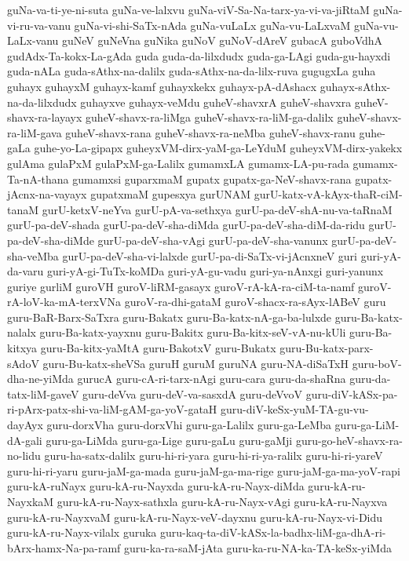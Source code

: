 {guNa-va-ti-ye-ni-suta
guNa-ve-lalxvu
guNa-viV-Sa-Na-tarx-ya-vi-va-jiRtaM
guNa-vi-ru-va-vanu
guNa-vi-shi-SaTx-nAda
guNa-vuLaLx
guNa-vu-LaLxvaM
guNa-vu-LaLx-vanu
guNeV
guNeVna
guNika
guNoV
guNoV-dAreV
gubacA
guboVdhA
gudAdx-Ta-kokx-La-gAda
guda
guda-da-lilxdudx
guda-ga-LAgi
guda-gu-hayxdi
guda-nALa
guda-sAthx-na-dalilx
guda-sAthx-na-da-lilx-ruva
gugugxLa
guha
guhayx
guhayxM
guhayx-kamf
guhayxkekx
guhayx-pA-dAshacx
guhayx-sAthx-na-da-lilxdudx
guhayxve
guhayx-veMdu
guheV-shavxrA
guheV-shavxra
guheV-shavx-ra-layayx
guheV-shavx-ra-liMga
guheV-shavx-ra-liM-ga-dalilx
guheV-shavx-ra-liM-gava
guheV-shavx-rana
guheV-shavx-ra-neMba
guheV-shavx-ranu
guhe-gaLa
guhe-yo-La-gipapx
guheyxVM-dirx-yaM-ga-LeYduM
guheyxVM-dirx-yakekx
gulAma
gulaPxM
gulaPxM-ga-Lalilx
gumamxLA
gumamx-LA-pu-rada
gumamx-Ta-nA-thana
gumamxsi
guparxmaM
gupatx
gupatx-ga-NeV-shavx-rana
gupatx-jAcnx-na-vayayx
gupatxmaM
gupesxya
gurUNAM
gurU-katx-vA-kAyx-thaR-ciM-tanaM
gurU-ketxV-neYva
gurU-pA-va-sethxya
gurU-pa-deV-shA-nu-va-taRnaM
gurU-pa-deV-shada
gurU-pa-deV-sha-diMda
gurU-pa-deV-sha-diM-da-ridu
gurU-pa-deV-sha-diMde
gurU-pa-deV-sha-vAgi
gurU-pa-deV-sha-vanunx
gurU-pa-deV-sha-veMba
gurU-pa-deV-sha-vi-lalxde
gurU-pa-di-SaTx-vi-jAcnxneV
guri
guri-yA-da-varu
guri-yA-gi-TuTx-koMDa
guri-yA-gu-vadu
guri-ya-nAnxgi
guri-yanunx
guriye
gurliM
guroVH
guroV-liRM-gasayx
guroV-rA-kA-ra-ciM-ta-namf
guroV-rA-loV-ka-mA-terxVNa
guroV-ra-dhi-gataM
guroV-shacx-ra-sAyx-lABeV
guru
guru-BaR-Barx-SaTxra
guru-Bakatx
guru-Ba-katx-nA-ga-ba-lulxde
guru-Ba-katx-nalalx
guru-Ba-katx-yayxnu
guru-Bakitx
guru-Ba-kitx-seV-vA-nu-kUli
guru-Ba-kitxya
guru-Ba-kitx-yaMtA
guru-BakotxV
guru-Bukatx
guru-Bu-katx-parx-sAdoV
guru-Bu-katx-sheVSa
guruH
guruM
guruNA
guru-NA-diSaTxH
guru-boV-dha-ne-yiMda
gurucA
guru-cA-ri-tarx-nAgi
guru-cara
guru-da-shaRna
guru-da-tatx-liM-gaveV
guru-deVva
guru-deV-va-sasxdA
guru-deVvoV
guru-diV-kASx-pa-ri-pArx-patx-shi-va-liM-gAM-ga-yoV-gataH
guru-diV-keSx-yuM-TA-gu-vu-dayAyx
guru-dorxVha
guru-dorxVhi
guru-ga-Lalilx
guru-ga-LeMba
guru-ga-LiM-dA-gali
guru-ga-LiMda
guru-ga-Lige
guru-gaLu
guru-gaMji
guru-go-heV-shavx-ra-no-lidu
guru-ha-satx-dalilx
guru-hi-ri-yara
guru-hi-ri-ya-ralilx
guru-hi-ri-yareV
guru-hi-ri-yaru
guru-jaM-ga-mada
guru-jaM-ga-ma-rige
guru-jaM-ga-ma-yoV-rapi
guru-kA-ruNayx
guru-kA-ru-Nayxda
guru-kA-ru-Nayx-diMda
guru-kA-ru-NayxkaM
guru-kA-ru-Nayx-sathxla
guru-kA-ru-Nayx-vAgi
guru-kA-ru-Nayxva
guru-kA-ru-NayxvaM
guru-kA-ru-Nayx-veV-dayxnu
guru-kA-ru-Nayx-vi-Didu
guru-kA-ru-Nayx-vilalx
guruka
guru-kaq-ta-diV-kASx-la-badhx-liM-ga-dhA-ri-bArx-hamx-Na-pa-ramf
guru-ka-ra-saM-jAta
guru-ka-ru-NA-ka-TA-keSx-yiMda
}
